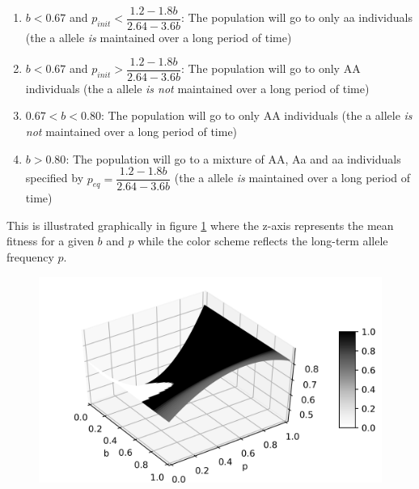 \documentclass{article}
\begin{document}
\begin{enumerate}

\item
$b<0.67$ and $p_{init} < \dfrac{1.2 - 1.8b}{2.64 - 3.6 b}$: The population will go to only aa individuals (the a allele \textit{is} maintained over a long period of time)

\item
$b<0.67$ and $p_{init} > \dfrac{1.2 - 1.8b}{2.64 - 3.6 b}$: The population will go to only AA individuals (the a allele \textit{is not} maintained over a long period of time)

\item
$0.67 < b < 0.80$: The population will go to only AA individuals (the a allele \textit{is not} maintained over a long period of time)

\item
$b>0.80$: The population will go to a mixture of AA, Aa and aa individuals specified by $p_{eq} = \dfrac{1.2 - 1.8b}{2.64 - 3.6 b}$ (the a allele \textit{is} maintained over a long period of time)

\end{enumerate}

This is illustrated graphically in figure \ref{fig:fsurf} where the z-axis represents the mean fitness for a given $b$ and $p$ while the color scheme reflects the long-term allele frequency $p$.

\begin{figure}[h]
		\centering
		\includegraphics[width = 0.6\linewidth, trim={0 0 0 0}, clip=true]{fsurfinit.png}
\label{fig:fsurf}
\end{figure}
\end{document}
